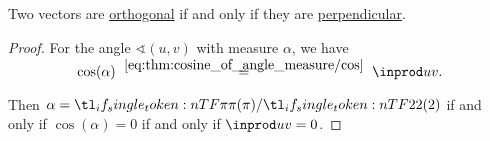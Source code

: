 \begin{proposition}\label{thm:perpendicular_iff_orthogonal}
  Two vectors are \hyperref[def:orthogonality]{orthogonal} if and only if they are \hyperref[def:perpendicularity]{perpendicular}.
\end{proposition}
\begin{proof}
  For the angle \( \sphericalangle(u, v) \) with measure \( \alpha \), we have
  \begin{equation*}
    \cos(\alpha)
    \reloset {\eqref{eq:thm:cosine_of_angle_measure/cos}} =
    \inprod u v.
  \end{equation*}

  Then \( \alpha = \ifrac \pi 2 \) if and only if \( \cos(\alpha) = 0 \) if and only if \( \inprod u v = 0 \).
\end{proof}

